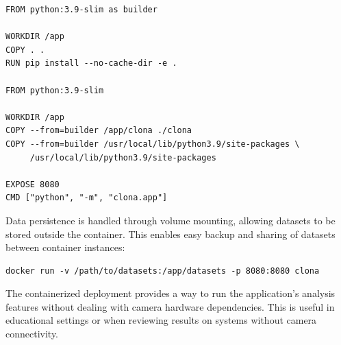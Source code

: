 \begin{verbatim}
FROM python:3.9-slim as builder

WORKDIR /app
COPY . .
RUN pip install --no-cache-dir -e .

FROM python:3.9-slim

WORKDIR /app
COPY --from=builder /app/clona ./clona
COPY --from=builder /usr/local/lib/python3.9/site-packages \
     /usr/local/lib/python3.9/site-packages

EXPOSE 8080
CMD ["python", "-m", "clona.app"]
\end{verbatim}

Data persistence is handled through volume mounting, allowing datasets to be stored outside the container. This enables easy backup and sharing of datasets between container instances:

\begin{verbatim}
docker run -v /path/to/datasets:/app/datasets -p 8080:8080 clona
\end{verbatim}

The containerized deployment provides a way to run the application's analysis features without dealing with camera hardware dependencies. This is useful in educational settings or when reviewing results on systems without camera connectivity.
